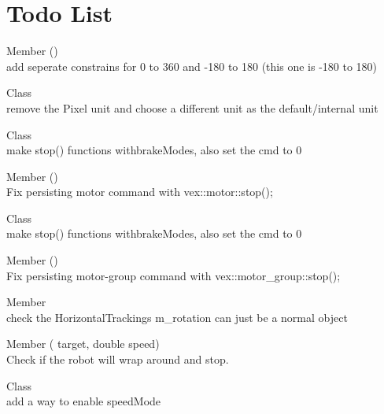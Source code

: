 \chapter{Todo List}
\hypertarget{todo}{}\label{todo}

\begin{DoxyRefList}
\item[Member \doxylink{classart_1_1_angle_ace8d0ebeae58b407fca15f951816e578}{art\+::Angle\+::constrain} ()]\hfill \\
\label{todo__todo000009}%
%
add seperate constrains for 0 to 360 and -\/180 to 180 (this one is -\/180 to 180) 
\item[Class \doxylink{classart_1_1_length}{art\+::Length} ]\hfill \\
\label{todo__todo000008}%
%
remove the Pixel unit and choose a different unit as the default/internal unit  
\item[Class \doxylink{classart_1_1_simple_motor}{art\+::Simple\+Motor} ]\hfill \\
\label{todo__todo000001}%
%
make stop() functions withbrake\+Modes, also set the cmd to 0  
\item[Member \doxylink{classart_1_1_simple_motor_aa3d8f01a6a434cdb8d6559dfe7b8d642}{art\+::Simple\+Motor\+::get} ()]\hfill \\
\label{todo__todo000002}%
%
Fix persisting motor command with vex\+::motor\+::stop(); 
\item[Class \doxylink{classart_1_1_simple_motor_group}{art\+::Simple\+Motor\+Group} ]\hfill \\
\label{todo__todo000003}%
%
make stop() functions withbrake\+Modes, also set the cmd to 0  
\item[Member \doxylink{classart_1_1_simple_motor_group_ae7e407ee8ae8e4c8456606cc1fcedf47}{art\+::Simple\+Motor\+Group\+::get} ()]\hfill \\
\label{todo__todo000004}%
%
Fix persisting motor-\/group command with vex\+::motor\+\_\+group\+::stop(); 
\item[Member \doxylink{structart_1_1_smart_drive_1_1_horizontal_tracker_aebb22dcbead67652edd15ad44f91628e}{art\+::Smart\+Drive\+::Horizontal\+Tracker\+::m\+\_\+rotation} ]\hfill \\
\label{todo__todo000006}%
%
check the Horizontal\+Tracking\textquotesingle{}s m\+\_\+rotation can just be a normal object  
\item[Member \doxylink{classart_1_1_smart_drive_ac8ad1666ce9a6f10e1e5a0414ca098a3}{art\+::Smart\+Drive\+::turn\+For} (\doxylink{classart_1_1_angle}{Angle} target, double speed)]\hfill \\
\label{todo__todo000005}%
%
Check if the robot will wrap around and stop. 
\item[Class \doxylink{classart_1_1_tank_drive}{art\+::Tank\+Drive} ]\hfill \\
\label{todo__todo000007}%
%
add a way to enable speed\+Mode 




\end{DoxyRefList}
